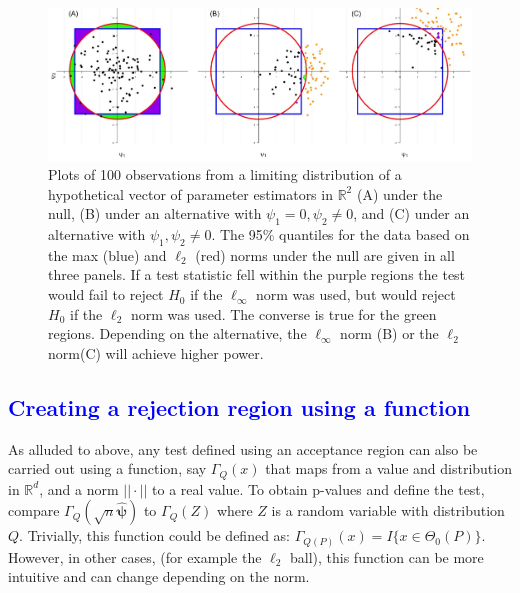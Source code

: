 \documentclass{article}
\newcommand{\disto}{P}
\newcommand{\rvv}{Z}
\newcommand{\distv}{Q}
\begin{document}
\begin{figure}
	\centering
	\includegraphics[width = \linewidth]{figure_code/pwr_cmp.jpeg}
	\caption{Plots of 100 observations from a limiting distribution of a hypothetical vector of parameter estimators in $\mathbb{R}^2$ (A) under the null, (B) under an alternative with $\psi_1 = 0, \psi_2 \neq 0$, and (C) under an alternative with $\psi_1, \psi_2 \neq 0$. The 95\% quantiles for the data based on the max (blue) and $\ell_2$ (red) norms under the null are given in all three panels. If a test statistic fell within the purple regions the test would fail to reject $H_0$ if the $\ell_\infty$ norm was used, but would reject $H_0$ if the $\ell_2$ norm was used.  The converse is true for the green regions.  Depending on the alternative, the $\ell_\infty$ norm (B) or the $\ell_2$ norm(C) will achieve higher power.}
	\label{fig:figure1}
\end{figure}

\subsection{\textcolor{blue}{Creating a rejection region using a function}}

As alluded to above, any test defined using an acceptance region can also be carried out using a function, say $\Gamma_\distv(x)$ that maps from a value and distribution in $\mathbb{R}^d$, and a norm $||\cdot||$ to a real value.  To obtain p-values and define the test, compare $\Gamma_\distv(\sqrt{n}\hat{\boldsymbol{\psi}})$ to $\Gamma_\distv(\rvv)$ where $\rvv$ is a random variable with distribution $\distv$. Trivially, this function could be defined as: $\Gamma_{\distv(\disto)}(x) = I\{x \in \Theta_0(\disto)\}$.  However, in other cases, (for example the $\ell_2$ ball), this function can be more intuitive and can change depending on the norm.  
\end{document}

